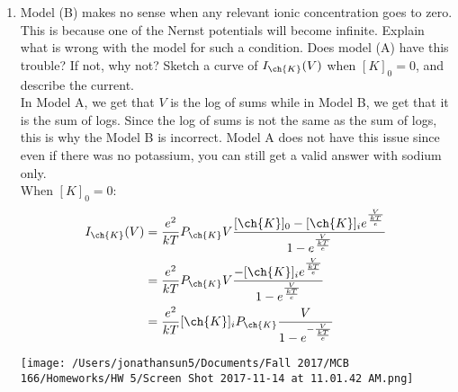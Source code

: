 \documentclass[11pt]{article}
\begin{document}
\begin{enumerate}[label=\arabic*.]
\begin{enumerate}[label=(\alph*)]
\item
Model (B) makes no sense when any relevant ionic concentration goes to zero. This is because one of the Nernst potentials will become infinite. Explain what is wrong with the model for such a condition. Does model (A) have this trouble? If not, why not? Sketch a curve of $I_{\ch{K}}(V)$ when $[K]_0 = 0$, and describe the current.
\vspace*{1\baselineskip}
\\
In Model A, we get that $V$ is the log of sums while in Model B, we get that it is the sum of logs. Since the log of sums is not the same as the sum of logs, this is why the Model B is incorrect. Model A does not have this issue since even if there was no potassium, you can still get a valid answer with sodium only. 
\vspace*{1\baselineskip}
\\
When $[K]_0 = 0$:
\begin{align*}
I_{\ch{K}}(V) &= \frac{e^2} {kT} P_{\ch{K}} V \frac{[\ch{K}]_0 - [\ch{K}]_i e^{\frac{V} {\frac{kT} {e}}}} {1 - e^{\frac{V} {\frac{kT} {e}}}} \\
&= \frac{e^2} {kT} P_{\ch{K}} V \frac{-[\ch{K}]_i e^{\frac{V} {\frac{kT} {e}}}} {1 - e^{\frac{V} {\frac{kT} {e}}}} \\
&= \frac{e^2} {kT} [\ch{K}]_i P_{\ch{K}} \frac{V} {1 - e^{-\frac{V} {\frac{kT} {e}}}}
\end{align*}
\begin{center}
\texttt{[image: /Users/jonathansun5/Documents/Fall 2017/MCB 166/Homeworks/HW 5/Screen Shot 2017-11-14 at 11.01.42 AM.png]}
\end{center}
\end{enumerate}
\end{enumerate}
\end{document}
